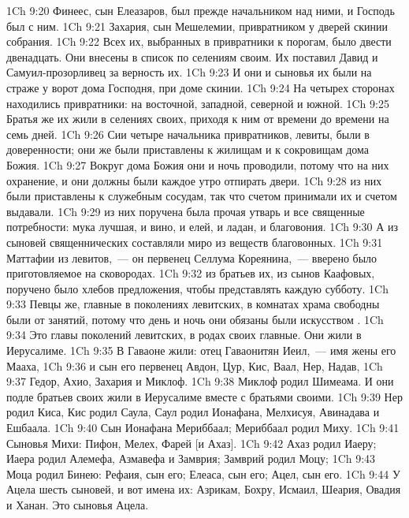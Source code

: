 \vs 1Ch 9:20 Финеес, сын Елеазаров, был прежде начальником над ними, и Господь был с ним.
\vs 1Ch 9:21 Захария, сын Мешелемии,  привратником у дверей скинии собрания.
\vs 1Ch 9:22 Всех их, выбранных в привратники к порогам, было двести двенадцать. Они внесены в список по селениям своим. Их поставил Давид и Самуил-прозорливец за верность их.
\vs 1Ch 9:23 И они и сыновья их были на страже у ворот дома Господня, при доме скинии.
\vs 1Ch 9:24 На четырех сторонах находились привратники: на восточной, западной, северной и южной.
\vs 1Ch 9:25 Братья же их жили в селениях своих, приходя к ним от времени до времени на семь дней.
\vs 1Ch 9:26 Сии четыре начальника привратников, левиты, были в доверенности; они же были приставлены к жилищам и к сокровищам дома Божия.
\vs 1Ch 9:27 Вокруг дома Божия они и ночь проводили, потому что на них  охранение, и они должны были каждое утро отпирать двери.
\vs 1Ch 9:28  из них были приставлены к служебным сосудам, так что счетом принимали их и счетом выдавали.
\vs 1Ch 9:29  из них поручена была прочая утварь и все священные потребности: мука лучшая, и вино, и елей, и ладан, и благовония.
\rsbpar\vs 1Ch 9:30 А из сыновей священнических  составляли миро из веществ благовонных.
\vs 1Ch 9:31 Маттафии из левитов,~--- он первенец Селлума Кореянина,~--- вверено было приготовляемое на сковородах.
\vs 1Ch 9:32  из братьев их, из сынов Каафовых, поручено было  хлебов предложения, чтобы представлять  каждую субботу.
\vs 1Ch 9:33 Певцы же, главные в поколениях левитских, в комнатах храма свободны были от занятий, потому что день и ночь они обязаны были  искусством .
\vs 1Ch 9:34 Это главы поколений левитских, в родах своих главные. Они жили в Иерусалиме.
\rsbpar\vs 1Ch 9:35 В Гаваоне жили: отец Гаваонитян Иеил,~--- имя жены его Мааха,
\vs 1Ch 9:36 и сын его первенец Авдон,  Цур, Кис, Ваал, Нер, Надав,
\vs 1Ch 9:37 Гедор, Ахио, Захария и Миклоф.
\vs 1Ch 9:38 Миклоф родил Шимеама. И они подле братьев своих жили в Иерусалиме вместе с братьями своими.
\vs 1Ch 9:39 Нер родил Киса, Кис родил Саула, Саул родил Ионафана, Мелхисуя, Авинадава и Ешбаала.
\vs 1Ch 9:40 Сын Ионафана Мериббаал; Мериббаал родил Миху.
\vs 1Ch 9:41 Сыновья Михи: Пифон, Мелех, Фарей [и Ахаз].
\vs 1Ch 9:42 Ахаз родил Иаеру; Иаера родил Алемефа, Азмавефа и Замврия; Замврий родил Моцу;
\vs 1Ch 9:43 Моца родил Бинею: Рефаия, сын его; Елеаса, сын его; Ацел, сын его.
\vs 1Ch 9:44 У Ацела шесть сыновей, и вот имена их: Азрикам, Бохру, Исмаил, Шеария, Овадия и Ханан. Это сыновья Ацела.
